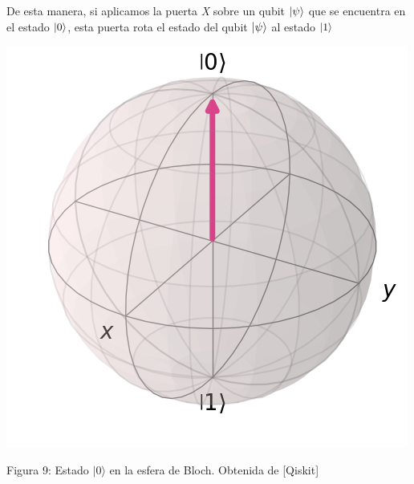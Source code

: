 \documentclass[12pt]{article}
\numberwithin{equation}{section} %
\begin{document}
    \vspace{2.5mm}

    De esta manera, si aplicamos la puerta \textit{X} sobre un qubit \( \ket{\psi} \) que se encuentra en el estado \( \ket{0} \), esta puerta rota el estado del qubit \( \ket{\psi} \) al estado \( \ket{1} \)

    \vspace{5mm}

    \begin{minipage}{0.1\textwidth}
        \hfill
    \end{minipage}
    \begin{minipage}{0.3\textwidth}
        \centering
        \includegraphics[width=\textwidth]{img/Bloch/bloch_state_0.png}
        \caption{Figura 9: Estado $|0\rangle$ en la esfera de Bloch. Obtenida de [Qiskit]}
    \end{minipage}
    \hfill
    \hfill
\end{document}
